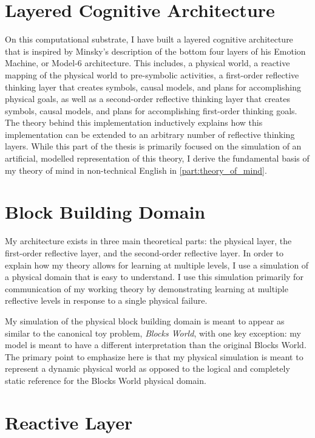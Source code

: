 \section{Layered Cognitive Architecture}

On this computational substrate, I have built a layered cognitive
architecture that is inspired by Minsky's description of the bottom
four layers of his Emotion Machine, or Model-6 architecture.  This
includes, a physical world, a reactive mapping of the physical world
to pre-symbolic activities, a first-order reflective thinking layer
that creates symbols, causal models, and plans for accomplishing
physical goals, as well as a second-order reflective thinking layer
that creates symbols, causal models, and plans for accomplishing
first-order thinking goals.  The theory behind this implementation
inductively explains how this implementation can be extended to an
arbitrary number of reflective thinking layers.  While this part of
the thesis is primarily focused on the simulation of an artificial,
modelled representation of this theory, I derive the fundamental basis
of my theory of mind in non-technical English in
\autoref{part:theory_of_mind}.

\section{Block Building Domain}

My architecture exists in three main theoretical parts: the physical
layer, the first-order reflective layer, and the second-order
reflective layer.  In order to explain how my theory allows for
learning at multiple levels, I use a simulation of a physical domain
that is easy to understand.  I use this simulation primarily for
communication of my working theory by demonstrating learning at
multiple reflective levels in response to a single physical failure.

My simulation of the physical block building domain is meant to appear
as similar to the canonical toy problem, \emph{Blocks World}, with one
key exception: my model is meant to have a different interpretation
than the original Blocks World.  The primary point to emphasize here
is that my physical simulation is meant to represent a dynamic
physical world as opposed to the logical and completely static
reference for the Blocks World physical domain.



\section{Reactive Layer}

